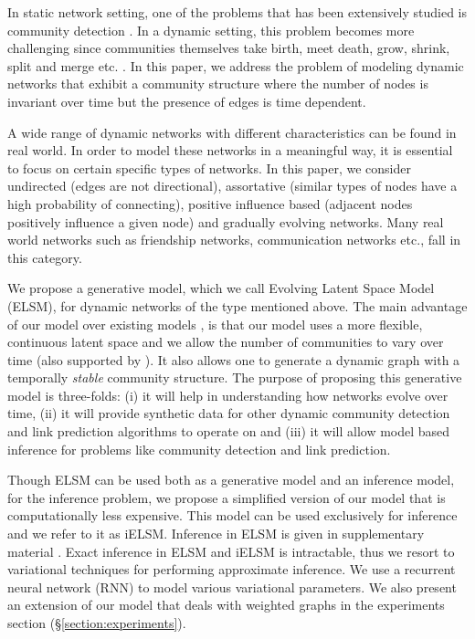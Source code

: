 \documentclass[letterpaper]{article} %
\begin{document}
In static network setting, one of the problems that has been extensively studied is community detection \cite{Fortunato:2010:CommunityDetectionInGraphs}. In a dynamic setting, this problem becomes more challenging since communities themselves take birth, meet death, grow, shrink, split and merge etc. \cite{RossettiEtAl:2017:CommunityDiscoverInDynamicNetworksASurvey}. In this paper,  we address the problem of modeling dynamic networks that exhibit a community structure where the number of nodes is invariant over time but the presence of edges is time dependent.

A wide range of dynamic networks with different characteristics can be found in real world. In order to model these networks in a meaningful way, it is essential to focus on certain specific types of networks. In this paper, we consider undirected (edges are not directional), assortative (similar types of nodes have a high probability of connecting), positive influence based (adjacent nodes positively influence a given node) and gradually evolving networks. Many real world networks such as friendship networks, communication networks etc., fall in this category.

We propose a generative model, which we call Evolving Latent Space Model (ELSM), for dynamic networks of the type mentioned above. The main advantage of our model over existing models \cite{XingEtAl:2010:AStateSpaceMixedMembershipBlockmodelForDynamicNetworkTomography,FouldsEtAl:2011:ADynamicRelationalInfiniteFeatureModelForLongitudinalSocialNetworks,HeaukulaniEtAl:2013:DynamicProbabilisticModelsForLatentFeaturePropagationInSocialNetworks,KimEtAl:2013:NonparametricMultiGroupMembershipModelForDynamicNetworks,XuHero:2014:DynamicStochasticBlockmodelsForTimeEvolvingSocialNetworks}, is that our model uses a more flexible, continuous latent space and we allow the number of communities to vary over time (also supported by \cite{KimEtAl:2013:NonparametricMultiGroupMembershipModelForDynamicNetworks}). It also allows one to generate a dynamic graph with a temporally \textit{stable} community structure. The purpose of proposing this generative model is three-folds: (i) it will help in understanding how networks evolve over time, (ii) it will provide synthetic data for other dynamic community detection and link prediction algorithms to operate on and (iii) it will allow model based inference for problems like community detection and link prediction.

Though ELSM can be used both as a generative model and an inference model, for the inference problem, we propose a simplified version of our model that is computationally less expensive. This model can be used exclusively for inference and we refer to it as iELSM. Inference in ELSM is given in supplementary material \cite{GuptaEtAl:2018:AGenerativeModelForDynamicNetworksWithApplicationsSupplementaryMaterial}. Exact inference in ELSM and iELSM is intractable, thus we resort to variational techniques for performing approximate inference. We use a recurrent neural network (RNN)  to model various variational parameters. We also present an extension of our model that deals with weighted graphs in the experiments section (\S \ref{section:experiments}).
\end{document}

